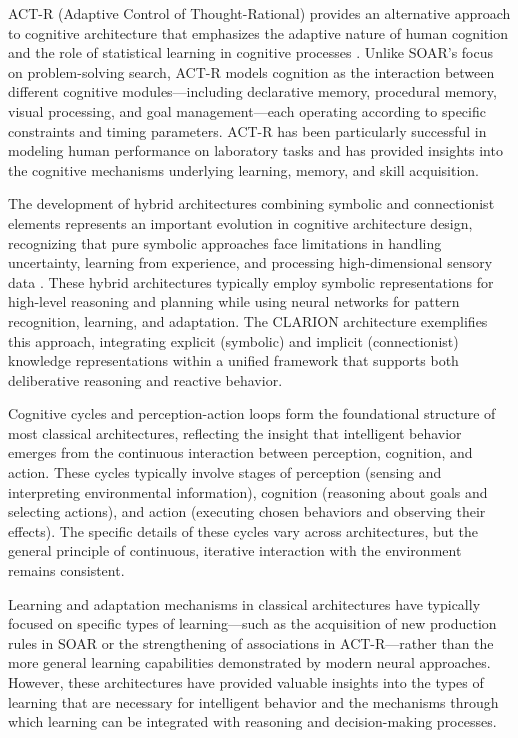 ACT-R (Adaptive Control of Thought-Rational) provides an alternative approach to cognitive architecture that emphasizes the adaptive nature of human cognition and the role of statistical learning in cognitive processes \cite{anderson2004integrated}. Unlike SOAR's focus on problem-solving search, ACT-R models cognition as the interaction between different cognitive modules—including declarative memory, procedural memory, visual processing, and goal management—each operating according to specific constraints and timing parameters. ACT-R has been particularly successful in modeling human performance on laboratory tasks and has provided insights into the cognitive mechanisms underlying learning, memory, and skill acquisition.

The development of hybrid architectures combining symbolic and connectionist elements represents an important evolution in cognitive architecture design, recognizing that pure symbolic approaches face limitations in handling uncertainty, learning from experience, and processing high-dimensional sensory data \cite{sun2007hybrid}. These hybrid architectures typically employ symbolic representations for high-level reasoning and planning while using neural networks for pattern recognition, learning, and adaptation. The CLARION architecture exemplifies this approach, integrating explicit (symbolic) and implicit (connectionist) knowledge representations within a unified framework that supports both deliberative reasoning and reactive behavior.

Cognitive cycles and perception-action loops form the foundational structure of most classical architectures, reflecting the insight that intelligent behavior emerges from the continuous interaction between perception, cognition, and action. These cycles typically involve stages of perception (sensing and interpreting environmental information), cognition (reasoning about goals and selecting actions), and action (executing chosen behaviors and observing their effects). The specific details of these cycles vary across architectures, but the general principle of continuous, iterative interaction with the environment remains consistent.

Learning and adaptation mechanisms in classical architectures have typically focused on specific types of learning—such as the acquisition of new production rules in SOAR or the strengthening of associations in ACT-R—rather than the more general learning capabilities demonstrated by modern neural approaches. However, these architectures have provided valuable insights into the types of learning that are necessary for intelligent behavior and the mechanisms through which learning can be integrated with reasoning and decision-making processes.

